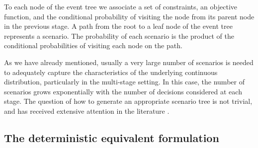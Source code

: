 To each node of the event tree we associate a set of constraints, an 
objective function, and the conditional probability of visiting the 
node from its parent node in the previous stage.
A path from the root to a leaf node of the event tree represents a 
scenario.
The probability of each scenario is the product of the 
conditional probabilities of visiting each node on the path.

As we have already mentioned, usually a very large number of scenarios is
needed to adequately capture the characteristics of the underlying
continuous distribution, particularly in the multi-stage setting.
In this case, the number of scenarios grows exponentially with the
number of decisions considered at each stage.
The question of how to generate an appropriate scenario tree
is not trivial, and has received extensive attention in the
literature 
\cite{DupacovaConsigliWallace,HoylandKautWallace,HoylandWallace,Pflug01}.

%
%
\subsection{The deterministic equivalent formulation}
\label{DetEqForm}

